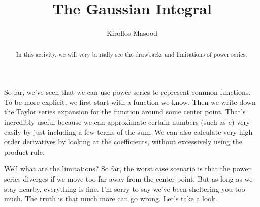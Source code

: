 \documentclass{ximera}
\title{The Gaussian Integral}
\author{Kirollos Masood}
\begin{document}
\begin{abstract}
In this activity, we will very brutally see the drawbacks and limitations of power series.
\end{abstract}
\maketitle

So far, we've seen that we can use power series to represent common functions. To be more explicit, we first start with a function we know. Then we write down the Taylor series expansion for the function around some center point. That's incredibly useful because we can approximate certain numbers (such as $e$) very easily by just including a few terms of the sum. We can also calculate very high order derivatives by looking at the coefficients, without excessively using the product rule.

Well what are the limitations? So far, the worst case scenario is that the power series diverges if we move too far away from the center point. But as long as we stay nearby, everything is fine. I'm sorry to say we've been sheltering you too much. The truth is that much more can go wrong. Let's take a look.
\end{document}
